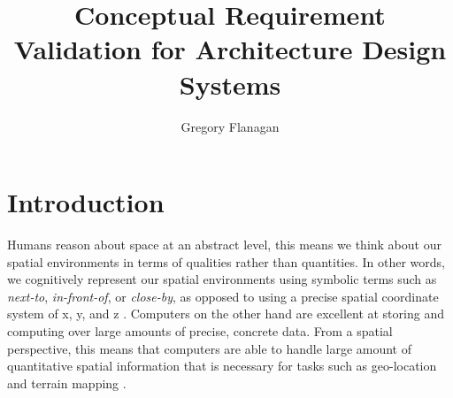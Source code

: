 \documentclass[12pt]{ucthesis}
\begin{document}

\title{Conceptual Requirement Validation for Architecture Design Systems}
\author{Gregory Flanagan}
  
 
     



\maketitle

\begin{frontmatter}

\copyrightpage

\committeemembershippage

\begin{abstract}
 



\end{abstract}





\tableofcontents


\listoftables

\listoffigures

\end{frontmatter}

\pagestyle{plain}




\renewcommand{\baselinestretch}{1.66}







\chapter{Introduction}
\label{intro}
Humans reason about space at an abstract level, this means we think about our spatial environments in terms of qualities rather than quantities. In other words, we cognitively represent our spatial environments using symbolic terms such as \emph{next-to}, \emph{in-front-of}, or \emph{close-by}, as opposed to using a precise spatial coordinate system of x, y, and z  \cite{freksa1991qsr} \cite{Cohn:2001:QSR}. Computers on the other hand are excellent at storing and computing over large amounts of precise, concrete data. From a spatial perspective, this means that computers are able to handle large amount of quantitative spatial information that is necessary for tasks such as geo-location and terrain mapping \cite{somebody}. 
\end{document}
